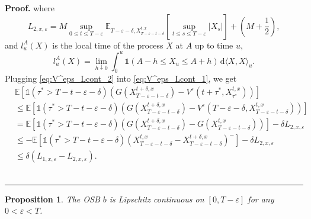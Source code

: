 \documentclass{tufte-handout}
\newcommand{\E}{\mathbb{E}} %
\newcommand{\dif}{\mathrm{d}}
\newtheorem{pr}{Proposition}
\newenvironment{pf}[1][Proof]{\textbf{#1.} }{\ \rule{0.5em}{0.5em}}
\begin{document}
\begin{pf}
		where 
		$$
		L_{2, x, \varepsilon} = M\sup_{0\leq t\leq T - \varepsilon}\E_{T - \varepsilon - \delta, X_{T - \varepsilon - t - \delta}^{t, x}}\left[\sup_{t\leq s\leq T - \varepsilon}\left|X_{s}\right|\right] + \left(M + \frac{1}{2}\right),
		$$
		and $l_u^A(X)$ is the local time of the process $X$ at $A$ up to time $u$,
		$$
		l_u^A(X) = \lim_{h\downarrow 0} \int_{0}^{u}\mathbb{1}(A - h \leq X_u \leq A + h)\,\dif \langle X, X\rangle_u.
		$$
		Plugging \eqref{eq:V^eps_Lcont_2} into \eqref{eq:V^eps_Lcont_1}, we get
		\begin{align}
		&\E\left[\mathbb{1}(\tau^* > T - t - \varepsilon - \delta)\left(G(X_{T - \varepsilon - t - \delta}^{t + \delta, x}) - V^{\varepsilon}(t + \tau^*, X_{\tau^*}^{t, x})\right)\right] \nonumber \\
		&\leq \E\left[\mathbb{1}(\tau^* > T - t - \varepsilon - \delta)\left(G(X_{T - \varepsilon - t - \delta}^{t + \delta, x}) - V^{\varepsilon}(T - \varepsilon - \delta, X_{T - \varepsilon - t - \delta}^{t, x})\right)\right] \nonumber \\
		&= \E\left[\mathbb{1}(\tau^* > T - t - \varepsilon - \delta)\left(G(X_{T - \varepsilon - t - \delta}^{t + \delta, x}) - G(X_{T - \varepsilon - t - \delta}^{t, x})\right)\right] - \delta L_{2, x, \varepsilon} \nonumber \\ 
		&\leq - \E\left[\mathbb{1}(\tau^* > T - t - \varepsilon - \delta)\left(X_{T - \varepsilon - t - \delta}^{t, x} - X_{T - \varepsilon - t - \delta}^{t + \delta, x}\right)^-\right] - \delta L_{2, x, \varepsilon} \nonumber \\ 
		&\leq  \delta\left(L_{1, x, \varepsilon} - L_{2, x, \varepsilon}\right). \label{eq:V^eps_Lcont_3}
		\end{align}
	\end{pf}
	
	
	\begin{pr}\label{pr:OSB_LC_OUB}
		The OSB $b$ is Lipschitz continuous on $[0, T - \varepsilon]$ for any $0 < \varepsilon < T$.
	\end{pr}
	
\end{document}
